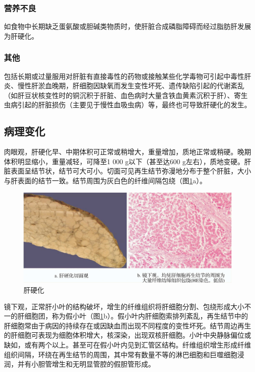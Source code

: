\subsubsection{营养不良}

如食物中长期缺乏蛋氨酸或胆碱类物质时，使肝脏合成磷脂障碍而经过脂肪肝发展为肝硬化。

\subsubsection{其他}

包括长期或过量服用对肝脏有直接毒性的药物或接触某些化学毒物可引起中毒性肝炎、慢性肝淤血晚期，肝细胞因缺氧而发生变性坏死、遗传缺陷引起的代谢紊乱（如肝豆状核变性时的铜沉积于肝脏、血色病时大量含铁血黄素沉积于肝）、寄生虫病引起的肝脏损伤（主要见于慢性血吸虫病）等，最终也可导致肝硬化的发生。

\subsection{病理变化}

肉眼观，肝硬化早、中期体积可正常或稍增大，重量增加，质地正常或稍硬。晚期体积明显缩小，重量减轻，可降至1
000 g以下（甚至达600
g左右），质地变硬。肝脏表面呈结节状，结节可大可小。切面可见再生结节弥漫地分布于整个肝脏，大小与肝表面的结节一致。结节周围为灰白色的纤维间隔包绕（图\ref{fig8-9}a）。

\begin{figure}[!htbp]
 \centering
 \includegraphics{./images/Image00137.jpg}
 \captionsetup{justification=centering}
 \caption{肝硬化}
 \label{fig8-9}
  \end{figure} 

镜下观，正常肝小叶的结构破坏，增生的纤维组织将肝细胞分割、包绕形成大小不一的肝细胞团，称为假小叶（图\ref{fig8-9}b）。假小叶内肝细胞索排列紊乱，再生结节中的肝细胞常由于病因的持续存在或因缺血而出现不同程度的变性坏死。结节周边再生的肝细胞可表现为细胞体积增大，核深染，出现双核肝细胞。小叶中央静脉偏位或缺如，或有两个以上。甚至可在假小叶内见到汇管区结构。纤维组织增生形成纤维组织间隔，环绕在再生结节的周围，其中常有数量不等的淋巴细胞和巨噬细胞浸润，并有小胆管增生和无明显管腔的假胆管形成。

